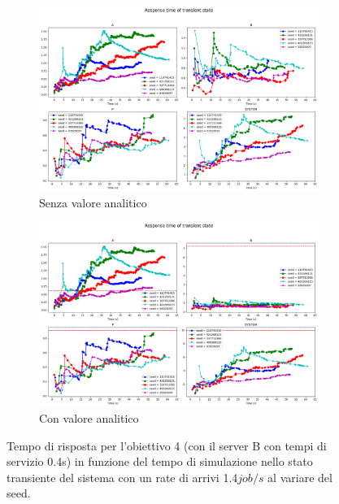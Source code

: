 \begin{figure}
    \centering
    \begin{subfigure}{\linewidth}
        \centering
        \includegraphics[width=0.8\linewidth]{figs/appendices/transient/obj4_04-transient-rtime.png}
        \caption{Senza valore analitico}
        \label{fig:obj4_04_transient_simulation}
        \end{subfigure} 
    \begin{subfigure}{\linewidth}
        \centering
        \includegraphics[width=0.8\linewidth]{figs/appendices/transient/obj4_04-transient-rtime-analitycal.png}
        \caption{Con valore analitico}
        \label{fig:obj4_04_transient_analitycal}
        \end{subfigure}
    \caption{Tempo di risposta per l'obiettivo 4 (con il server B con tempi di servizio 0.4s) in funzione del tempo di simulazione nello stato transiente del sistema con un rate di arrivi 1.4$job/s$ al variare del seed.}
    \label{fig:obj4_04_transient}
\end{figure}

